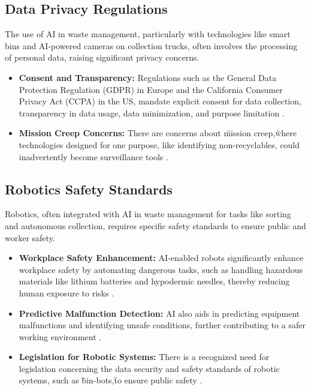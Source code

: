 \subsection{Data Privacy Regulations}
The use of AI in waste management, particularly with technologies like smart bins and AI-powered cameras on collection trucks, often involves the processing of personal data, raising significant privacy concerns.
\begin{itemize}
    \item \textbf{Consent and Transparency:}
Regulations such as the General Data Protection Regulation (GDPR) in Europe and the California Consumer Privacy Act (CCPA) in the US, mandate explicit consent for data collection, transparency in data usage, data minimization, and purpose limitation \cite{Talonic_Reg, DataGrail_Reg}.
    \item \textbf{Mission Creep Concerns:}
There are concerns about \"mission creep,\" where technologies designed for one purpose, like identifying non-recyclables, could inadvertently become surveillance tools \cite{DigWatch_Reg}.
\end{itemize}

\subsection{Robotics Safety Standards}
Robotics, often integrated with AI in waste management for tasks like sorting and autonomous collection, requires specific safety standards to ensure public and worker safety.
\begin{itemize}
    \item \textbf{Workplace Safety Enhancement:}
AI-enabled robots significantly enhance workplace safety by automating dangerous tasks, such as handling hazardous materials like lithium batteries and hypodermic needles, thereby reducing human exposure to risks \cite{TheComplianceCenter_Reg, RouteFifty_Reg}.
    \item \textbf{Predictive Malfunction Detection:}
AI also aids in predicting equipment malfunctions and identifying unsafe conditions, further contributing to a safer working environment \cite{Recycleye_Reg_Safety, Columbia_Reg_Safety}.
    \item \textbf{Legislation for Robotic Systems:}
There is a recognized need for legislation concerning the data security and safety standards of robotic systems, such as \"bin-bots,\" to ensure public safety \cite{GIHUB_Reg}.
\end{itemize}

